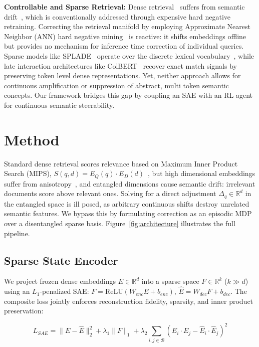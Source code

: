 \documentclass[sigconf]{acmart}
\begin{document}
\textbf{Controllable and Sparse Retrieval:}
Dense retrieval~\cite{karpukhin2020, izacard2022} suffers from semantic drift~\cite{zhan2021}, which is conventionally addressed through expensive hard negative retraining. Correcting the retrieval manifold by employing Approximate Nearest Neighbor (ANN) hard negative mining~\cite{xiong2021} is reactive: it shifts embeddings offline but provides no mechanism for inference time correction of individual queries. Sparse models like SPLADE~\cite{formal2021splade} operate over the discrete lexical vocabulary~\cite{robertson1994}, while late interaction architectures like ColBERT~\cite{khattab2020} recover exact match signals by preserving token level dense representations. Yet, neither approach allows for continuous amplification or suppression of abstract, multi token semantic concepts. Our framework bridges this gap by coupling an SAE with an RL agent for continuous semantic steerability.

\section{Method}

Standard dense retrieval scores relevance based on Maximum Inner Product Search (MIPS), $S(q,d) = E_Q(q) \cdot E_D(d)$~\cite{johnson2019}, but high dimensional embeddings suffer from anisotropy~\cite{ethayarajh2019}, and entangled dimensions cause semantic drift: irrelevant documents score above relevant ones. Solving for a direct adjustment $\Delta_q \in \mathbb{R}^d$ in the entangled space is ill posed, as arbitrary continuous shifts destroy unrelated semantic features. We bypass this by formulating correction as an episodic MDP~\cite{sutton2018} over a disentangled sparse basis. Figure~\ref{fig:architecture} illustrates the full pipeline.

\subsection{Sparse State Encoder}

We project frozen dense embeddings $E \in \mathbb{R}^d$ into a sparse space $F \in \mathbb{R}^k$ ($k \gg d$) using an $L_1$-penalized SAE: $F = \text{ReLU}(W_{enc}E + b_{enc})$, $\hat{E} = W_{dec}F + b_{dec}$. The composite loss jointly enforces reconstruction fidelity, sparsity, and inner product preservation:

\begin{equation}
L_{SAE} = \|E - \hat{E}\|_2^2 + \lambda_1 \|F\|_1 + \lambda_2 \sum_{i,j \in \mathcal{B}} (E_i \cdot E_j - \hat{E}_i \cdot \hat{E}_j)^2
\end{equation}
\end{document}
